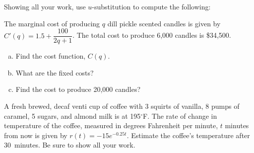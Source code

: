 \documentclass[12pt,letterpaper]{exam}
\begin{document}
\begin{questions}
\newpage
\question Showing all your work, use $u$-substitution to compute the following: \par\vspace{0.3cm}



\newpage
\question[15] The marginal cost of producing $q$ dill pickle scented candles is given by $C'(q)= 1.5 + \dfrac{100}{2q + 1}$. The total cost to produce 6,000 candles is \$34,500. 
	\begin{enumerate}[(a)]
	\item Find the cost function, $C(q)$.
	\item What are the fixed costs?
	\item Find the cost to produce 20,000 candles?
	\end{enumerate}



\newpage
\question[10] A fresh brewed, decaf venti cup of coffee with 3 squirts of vanilla, 8 pumps of caramel, 5 sugars, and almond milk is at 195$^\circ$F. The rate of change in temperature of the coffee, measured in degrees Fahrenheit per minute, $t$ minutes from now is given by $r(t)= -15 e^{-0.25t}$. Estimate the coffee's temperature after 30~minutes. Be sure to show all your work.


\end{questions}
\end{document}
